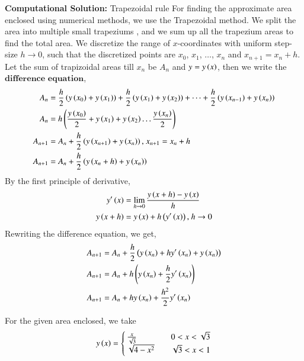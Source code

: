 \documentclass[journal]{IEEEtran}
\begin{document}
\textbf{Computational Solution:} Trapezoidal rule
\newline
For finding the approximate area enclosed using numerical methods, we use the Trapezoidal method. We split the area into multiple small trapeziums , and we sum up all the trapezium areas to find the total area. 
\newline
We discretize the range of $x$-coordinates with uniform step-size $h \to 0$, such that the discretized points are $x_0$, $x_1$, $\dots$, $x_n$ and $x_{n + 1} = x_n + h$.
\newline
Let the sum of trapizoidal areas till $x_n$ be $A_n$ and $y = y\left(x\right)$, then we write the $\textbf{difference equation}$,
\begin{align}
    A_n &= \frac{h}{2}\left(y\left(x_0\right) + y\left(x_1\right)\right) + \frac{h}{2}\left(y\left(x_1\right) + y\left(x_2\right)\right) + \dots + \frac{h}{2}\left(y\left(x_{n - 1}\right) + y\left(x_{n}\right)\right)\\
    A_n &= h\left(\frac{y\left(x_0\right)}{2} + y\left(x_1\right) + y\left(x_2\right) \dots \frac{y\left(x_n\right)}{2}\right)\\
    A_{n + 1} &= A_n + \frac{h}{2}\left(y\left(x_{n + 1}\right) + y\left(x_n\right)\right) \text{, } x_{n + 1} = x_n + h\\
    A_{n + 1} &= A_n + \frac{h}{2}\left(y\left(x_n + h\right) + y\left(x_n\right)\right)\\
\end{align}
By the first principle of derivative,
\begin{align}
    y^{\prime}\left(x\right) &= \lim_{h\to0} \frac{y\left(x + h\right) - y\left(x\right)}{h}\\
    y\left(x + h\right) &= y\left(x\right) + h\left(y^{\prime}\left(x\right)\right) \text{, } h\to0
\end{align}
Rewriting the difference equation, we get,
\begin{align}
    A_{n + 1} &= A_n + \frac{h}{2}\left(y\left(x_n\right) + hy^{\prime}\left(x_n\right) + y\left(x_n\right)\right)\\
    A_{n + 1} &= A_n + h\left(y\left(x_n\right) + \frac{h}{2}y^{\prime}\left(x_n\right)\right)\\
    A_{n + 1} &= A_n + hy\left(x_n\right) + \frac{h^2}{2}y^{\prime}\left(x_n\right)
\end{align}

For the given area enclosed, we take
\begin{align}
    y\left(x\right) =
    \begin{cases}
        \frac{x}{\sqrt{3}} & \quad 0 < x < \sqrt{3}\\
        \sqrt{4 - x^2} & \quad \sqrt{3} < x < 1
    \end{cases}
\end{align}
\end{document}
